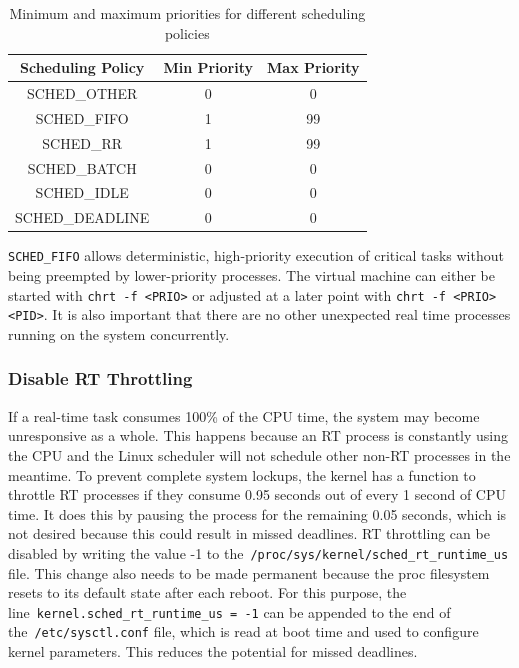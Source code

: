 \documentclass[MMR,Master,english]{twbook}
\begin{document}
\begin{table}[H]
	\centering
	\caption{Minimum and maximum priorities for different scheduling policies}
	\label{tab:scheduling_priorities}
	\setlength{\tabcolsep}{0.5em} %
	{\renewcommand{\arraystretch}{1.2}%
		\begin{tabular}{|c|c|c|}
			\hline
			\textbf{Scheduling Policy} & \textbf{Min Priority} & \textbf{Max Priority} \\ \hline
			SCHED\_OTHER               & 0                     & 0                     \\ \hline
			SCHED\_FIFO                & 1                     & 99                    \\ \hline
			SCHED\_RR                  & 1                     & 99                    \\ \hline
			SCHED\_BATCH               & 0                     & 0                     \\ \hline
			SCHED\_IDLE                & 0                     & 0                     \\ \hline
			SCHED\_DEADLINE            & 0                     & 0                     \\ \hline
		\end{tabular}}
\end{table}

\noindent \texttt{SCHED\_FIFO} allows deterministic, high-priority execution of critical tasks without being preempted by lower-priority processes. The virtual machine can either be started with \texttt{chrt -f <PRIO>} or adjusted at a later point with \texttt{chrt -f <PRIO> <PID>}. It is also important that there are no other unexpected real time processes running on the system concurrently.
\subsubsection{Disable RT Throttling}
If a real-time task consumes 100\% of the CPU time, the system may become unresponsive as a whole. This happens because an RT process is constantly using the CPU and the Linux scheduler will not schedule other non-RT processes in the meantime. To prevent complete system lockups, the kernel has a function to throttle RT processes if they consume 0.95 seconds out of every 1 second of CPU time. It does this by pausing the process for the remaining 0.05 seconds, which is not desired because this could result in missed deadlines. RT throttling can be disabled by  writing the value -1 to the~\texttt{/proc/sys/kernel/sched\_rt\_runtime\_us} file. This change also needs to be made permanent because the proc filesystem resets to its default state after each reboot. For this purpose, the line~\texttt{kernel.sched\_rt\_runtime\_us = -1} can be appended to the end of the~\texttt{/etc/sysctl.conf} file, which is read at boot time and used to configure kernel parameters. This reduces the potential for missed deadlines.
\end{document}

